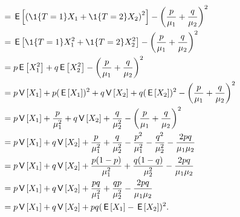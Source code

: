 \begin{extra}
\begin{solution}
\begin{align*}
&= \E{\left(\1{T=1} X_1 + \1{T=2} X_2\right)^2} - \left(\frac{p}{\mu_1}+\frac{q}{\mu_2}\right)^2 \\
&= \E{\1{T=1} X_1^2 + \1{T=2} X_2^2} - \left(\frac{p}{\mu_1}+\frac{q}{\mu_2}\right)^2 \\ 
&= p \E{X_1^2} + q \E{X_2^2} - \left(\frac{p}{\mu_1}+\frac{q}{\mu_2}\right)^2 \\ 
&= p \V{X_1} + p (\E{X_1})^2 + q \V{X_2} + q(\E{ X_2})^2 - \left(\frac{p}{\mu_1}+\frac{q}{\mu_2}\right)^2 \\ 
&= p \V{X_1} + \frac{p}{\mu_1^2} + q \V{X_2} + \frac{q}{\mu_2^2} - \left(\frac{p}{\mu_1}+\frac{q}{\mu_2}\right)^2 \\ 
&= p \V{X_1} + q \V{X_2}
+ \frac{p}{\mu_1^2} + \frac{q}{\mu_2^2}
- \frac{p^2}{\mu_1^2}-\frac{q^2}{\mu_2^2}  -\frac{2pq}{\mu_1\mu_2}\\ 
&= p \V{X_1} + q \V{X_2}
+ \frac{p(1-p)}{\mu_1^2} + \frac{q(1-q)}{\mu_2^2}
-\frac{2pq}{\mu_1\mu_2}\\ 
&= p \V{X_1} + q \V{X_2}
+ \frac{pq}{\mu_1^2} + \frac{qp}{\mu_2^2}
-\frac{2pq}{\mu_1\mu_2}\\ 
&= p \V{X_1} + q \V{X_2}
+ pq(\E{X_1} - \E{X_2})^2.
\end{align*}
\end{solution}
\end{extra}








